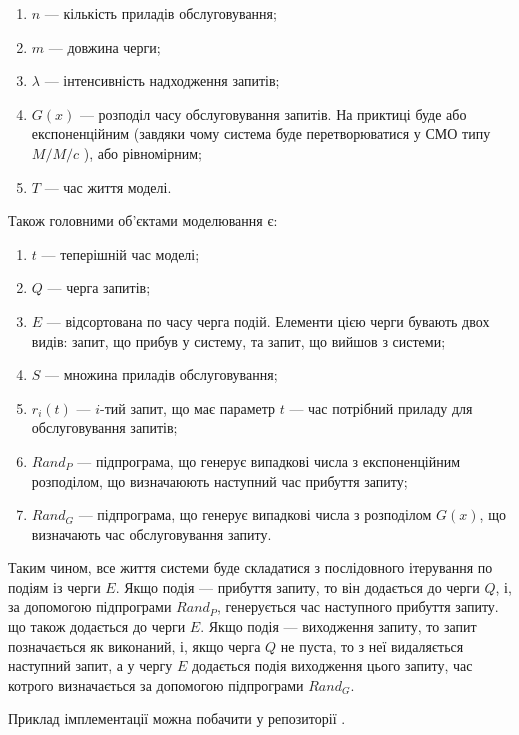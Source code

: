 \documentclass[14pt]{extarticle}
\begin{document}
\begin{enumerate}
  \item \(n\) --- кількість приладів обслуговування;
  \item \(m\) --- довжина черги;
  \item \(\lambda\) --- інтенсивність надходження запитів;
  \item \(G(x)\) --- розподіл часу обслуговування запитів. На приктиці буде або
        експоненційним (завдяки чому система буде перетворюватися у СМО типу
        \(M/M/c\) \cite{3}), або рівномірним;
  \item \(T\) --- час життя моделі.
\end{enumerate}

Також головними об\textquoteright єктами моделювання є:

\begin{enumerate}
  \item \(t\) --- теперішній час моделі;
  \item \(Q\) --- черга запитів;
  \item \(E\) --- відсортована по часу черга подій. Елементи цією черги бувають
        двох видів: запит, що прибув у систему, та запит, що вийшов з системи;
  \item \(S\) --- множина приладів обслуговування;
  \item \(r_{i}(t)\) --- \(i\)-тий запит, що має параметр \(t\) --- час потрібний
        приладу для обслуговування запитів;
  \item \(Rand_{P}\) --- підпрограма, що генерує випадкові числа з експоненційним
        розподілом, що визначаюють наступний час прибуття запиту;
  \item \(Rand_{G}\) --- підпрограма, що генерує випадкові числа з розподілом
        \(G(x)\), що визначають час обслуговування запиту.
\end{enumerate}

Таким чином, все життя системи буде складатися з послідовного ітерування по
подіям із черги \(E\). Якщо подія --- прибуття запиту, то він додається до черги
\(Q\), і, за допомогою підпрограми \(Rand_{P}\), генерується час наступного
прибуття запиту. що також додається до черги \(E\). Якщо подія --- виходження
запиту, то запит позначається як виконаний, і, якщо черга \(Q\) не пуста, то з
неї видаляється наступний запит, а у чергу \(E\) додається подія виходження
цього запиту, час котрого визначається за допомогою підпрограми \(Rand_{G}\).

Приклад  імплементації можна побачити у репозиторії \cite{Baybula_Analyze_on_PC_2023}.
\end{document}
